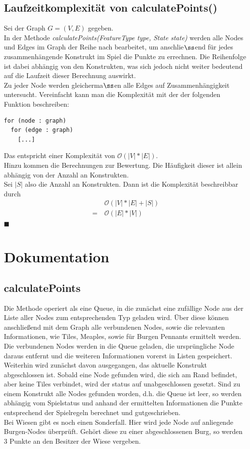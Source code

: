 \documentclass{article}
\newcommand*{\qed}{\hfill\ensuremath{\blacksquare}\\}%
\begin{document}
\subsection{Laufzeitkomplexit\"at von calculatePoints()}
Sei der Graph $G = (V,E)$ gegeben.\\
In der Methode \textit{calculatePoints(FeatureType type, State state)} werden alle Nodes und Edges im Graph der Reihe nach bearbeitet, um anschlie$\ss$end f\"ur jedes zusammenh\"angende Konstrukt im Spiel die Punkte zu errechnen. Die Reihenfolge ist dabei abh\"angig von den Konstrukten, was sich jedoch nicht weiter bedeutend auf die Laufzeit dieser Berechnung auswirkt.\\
Zu jeder Node werden gleicherma$\ss$en alle Edges auf Zusammenh\"angigkeit untersucht. Vereinfacht kann man die Komplexit\"at mit der der folgenden Funktion beschreiben:
\begin{lstlisting}
for (node : graph)
  for (edge : graph)
    [...]
\end{lstlisting}
Das entspricht einer Komplexit\"at von $\mathcal{O}(|V|*|E|)$.\\
Hinzu kommen die Berechnungen zur Bewertung. Die H\"aufigkeit dieser ist allein abh\"angig von der Anzahl an Konstrukten.\\
Sei $|S|$ also die Anzahl an Konstrukten. Dann ist die Komplexit\"at beschreibbar durch
\begin{align*}
&\mathcal{O}(|V|*|E|+|S|)\\
= \ &\mathcal{O}(|E|*|V|)
\end{align*}
\qed

\section{Dokumentation}
\subsection{calculatePoints}
\label{sec:calculatePoints}
Die Methode operiert als eine Queue, in die zunächst eine zufällige Node aus der Liste aller Nodes zum entsprechenden Typ geladen wird. Über diese können anschließend mit dem Graph alle verbundenen Nodes, sowie die relevanten Informationen, wie Tiles, Meaples, sowie für Burgen Pennants ermittelt werden. Die verbundenen Nodes werden in die Queue geladen, die ursprüngliche Node daraus entfernt und die weiteren Informationen vorerst in Listen gespeichert. Weiterhin wird zunächst davon ausgegangen, das aktuelle Konstrukt abgeschlossen ist. Sobald eine Node gefunden wird, die sich am Rand befindet, aber keine Tiles verbindet, wird der status auf unabgeschlossen gesetzt. Sind zu einem Konstrukt alle Nodes gefunden worden, d.h. die Queue ist leer, so werden abhängig vom Spielstatus und anhand der ermittelten Informationen die Punkte entsprechend der Spielregeln berechnet und gutgeschrieben.\\
Bei Wiesen gibt es noch einen Sonderfall. Hier wird jede Node auf anliegende Burgen-Nodes überprüft. Gehört diese zu einer abgeschlossenen Burg, so werden 3 Punkte an den Besitzer der Wiese vergeben.
\end{document}
